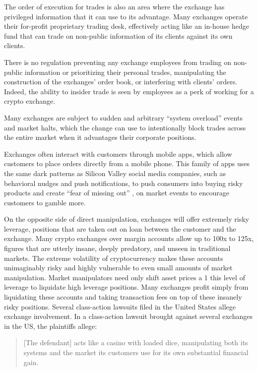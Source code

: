 The order of execution for trades is also an area where the exchange has
privileged information that it can use to its advantage. Many exchanges operate
their for-profit proprietary trading desk, effectively acting like an in-house
hedge fund that can trade on non-public information of its clients against its
own clients.

There is no regulation preventing any exchange employees from trading on
non-public information or prioritizing their personal trades, manipulating the
construction of the exchanges' order book, or interfering with clients' orders.
Indeed, the ability to insider trade is seen by employees as a perk of working
for a crypto exchange.

Many exchanges are subject to sudden and arbitrary ``system overload'' events and
market halts, which the change can use to intentionally block trades across the
entire market when it advantages their corporate positions.
\cite{ostroff_binance_2021}

Exchanges often interact with customers through mobile apps, which allow
customers to place orders directly from a mobile phone. This family of apps uses
the same dark patterns as Silicon Valley social media companies, such as
behavioral nudges and push notifications, to push consumers into buying risky
products and create ``fear of missing out'' \cite{lamba_fomo_2021}, on market
events to encourage customers to gamble more.


On the opposite side of direct manipulation, exchanges will offer extremely
risky leverage, positions that are taken out on loan between the customer and
the exchange. Many crypto exchanges over margin accounts allow up to 100x to
125x, figures that are utterly insane, deeply predatory, and unseen in
traditional markets. The extreme volatility of cryptocurrency makes these
accounts unimaginably risky and highly vulnerable to even small amounts of
market manipulation. Market manipulators need only shift asset prices a 1%
this level of leverage to liquidate high leverage positions. Many exchanges
profit simply from liquidating these accounts and taking transaction fees on top
of these insanely risky positions. Several class-action lawsuits filed in the
United States allege exchange involvement. In a class-action lawsuit brought
against several exchanges in the US, the plaintiffs allege:

\begin{quote}
{[}The defendant{]} acts like a casino with loaded dice, manipulating
both its systems and the market its customers use for its own
substantial financial gain.
\end{quote}

